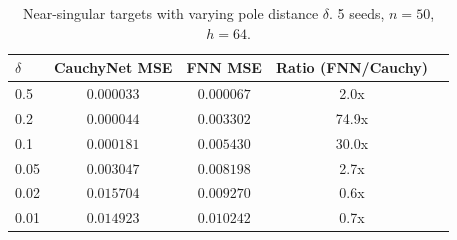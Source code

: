 \begin{table}[ht]\centering
\caption{Near-singular targets with varying pole distance $\delta$. 5 seeds, $n=50$, $h=64$.}
\label{tab:delta_sweep}
\begin{tabular}{lcccc}
\toprule
$\delta$ & CauchyNet MSE & FNN MSE & Ratio (FNN/Cauchy) \\
\midrule
0.5 & $0.000033$ & $0.000067$ & 2.0x \\
0.2 & $0.000044$ & $0.003302$ & 74.9x \\
0.1 & $0.000181$ & $0.005430$ & 30.0x \\
0.05 & $0.003047$ & $0.008198$ & 2.7x \\
0.02 & $0.015704$ & $0.009270$ & 0.6x \\
0.01 & $0.014923$ & $0.010242$ & 0.7x \\
\bottomrule
\end{tabular}
\end{table}